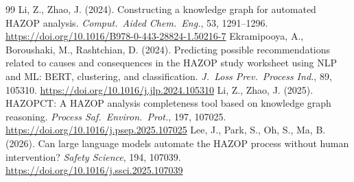 \documentclass[10pt,twocolumn,a4paper]{extarticle}
\begin{document}
\begin{thebibliography}{99}
 Li, Z., Zhao, J. (2024). Constructing a knowledge graph for automated HAZOP analysis. \emph{Comput.\ Aided Chem.\ Eng.}, 53, 1291--1296. \url{https://doi.org/10.1016/B978-0-443-28824-1.50216-7}
 Ekramipooya, A., Boroushaki, M., Rashtchian, D. (2024). Predicting possible recommendations related to causes and consequences in the HAZOP study worksheet using NLP and ML: BERT, clustering, and classification. \emph{J.\ Loss Prev.\ Process Ind.}, 89, 105310. \url{https://doi.org/10.1016/j.jlp.2024.105310}
 Li, Z., Zhao, J. (2025). HAZOPCT: A HAZOP analysis completeness tool based on knowledge graph reasoning. \emph{Process Saf.\ Environ.\ Prot.}, 197, 107025. \url{https://doi.org/10.1016/j.psep.2025.107025}
 Lee, J., Park, S., Oh, S., Ma, B. (2026). Can large language models automate the HAZOP process without human intervention? \emph{Safety Science}, 194, 107039. \url{https://doi.org/10.1016/j.ssci.2025.107039}
\end{thebibliography}
\end{document}
